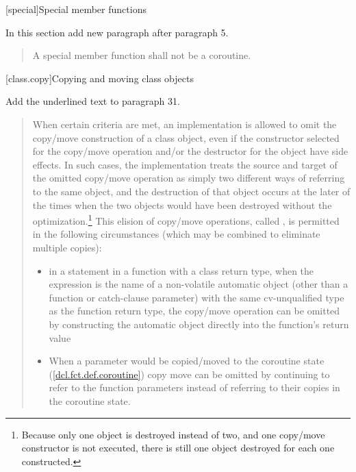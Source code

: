 
\setcounter{chapter}{11}
[special]{Special member functions}

In this section add new paragraph after paragraph 5.

\begin{quote}
	\setcounter{Paras}{5}
	\pnum
	A special member function shall not be a coroutine.
\end{quote}

\setcounter{section}{7}
[class.copy]{Copying and moving class objects}%


Add the underlined text to paragraph 31.

\begin{quote}
\setcounter{Paras}{30}
\pnum
{}%
%
%
%
%
When certain criteria are met, an implementation is
allowed to omit the copy/move construction of a class object,
even if the constructor selected for the copy/move operation and/or the
destructor for the object have
%
side effects.  In such cases, the
implementation treats the source and target of the
omitted copy/move operation as simply two different ways of
referring to the same object, and the destruction of
that object occurs at the later of the times when the
two objects would have been destroyed without the
optimization.\footnote{Because only one object is destroyed instead of two,
  and one copy/move constructor
  is not executed, there is still one object destroyed for each one constructed.}
This elision of copy/move operations, called
%
%
,
is permitted in the
following circumstances (which may be combined to
eliminate multiple copies):

\begin{itemize}
  \item in a  statement in a function with a class return type,
  when the expression is the name of a non-volatile
  automatic object
  (other than a function or catch-clause parameter)
  with the same cv-unqualified type as
  the function return type, the copy/move operation can be
  omitted by constructing the automatic object directly
  into the function's return value
  \item
  When a parameter would be copied/moved to the coroutine state (\ref{dcl.fct.def.coroutine}) copy move can be omitted by continuing to refer to the function parameters instead of referring to their copies in the coroutine state.
\end{itemize}
\end{quote}